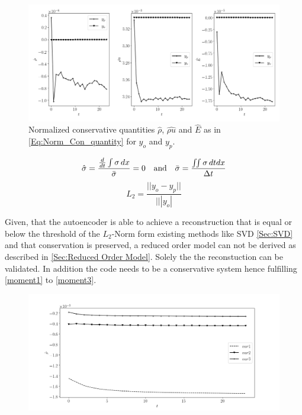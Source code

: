 \documentclass[12pt, a4paper]{article}
\begin{document}
\begin{figure}[!htbp]
	\includegraphics[width=\linewidth]{Figures/02_12_20/kn0p00001Conservative_Quantities/together/all_together.png}
	\caption{Normalized conservative quantities $\hat{\rho}$, $\hat{\rho u}$ and $\hat{E}$ as in \cref{Eq:Norm_Con_quantity} for $y_o$ and $y_p$.}
\end{figure}
\begin{multicols}{2}	
	\begin{equation}
	\hat{\sigma} = \frac{\frac{d}{dt} \int \sigma \,dx}{\bar{\sigma}} = 0 \quad\textrm{and}\quad \bar{\sigma} = \frac{\iint \sigma \,dtdx}{\Delta t}\label{Eq:Norm_Con_quantity}\\
	\end{equation}\break
	\begin{equation}
		L_2 = \frac{||y_o - y_p||}{|||y_o|} \label{L2-Norm}
	\end{equation}
\end{multicols}
Given, that the autoencoder is able to achieve a reconstruction that is equal or below the threshold of the $L_2$-Norm form existing methods like SVD \cref{Sec:SVD} and that conservation is preserved, a reduced order model can not be derived as described in \cref{Sec:Reduced Order Model}. Solely the the reconstuction can be validated. In addition the code needs to be a conservative system hence fulfilling \cref{moment1} to \cref{moment3}.
\begin{figure}
	\includegraphics[width=\linewidth]{Figures/02_12_20/kn0p00001Conservative_Quantities/code/Consrvative_Rho_Code.png}
\end{figure}
\end{document}
